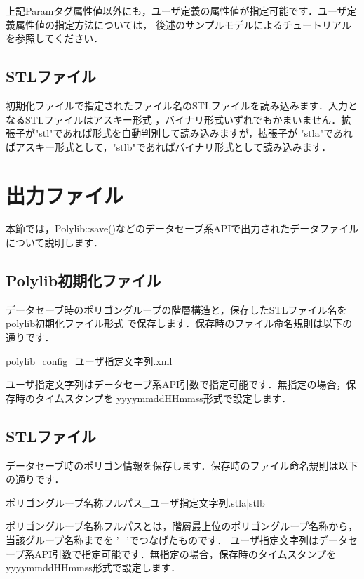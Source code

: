{上記Paramタグ属性値以外にも，ユーザ定義の属性値が指定可能です．ユーザ定義属性値の指定方法については，
後述のサンプルモデルによるチュートリアルを参照してください．

%
\subsection{STLファイル}
初期化ファイルで指定されたファイル名のSTLファイルを読み込みます．入力となるSTLファイルはアスキー形式
，バイナリ形式いずれでもかまいません．拡張子が"stl"であれば形式を自動判別して読み込みますが，拡張子が
"stla"であればアスキー形式として，"stlb"であればバイナリ形式として読み込みます．

%
\section{出力ファイル} \label{output_file}
本節では，Polylib::save()などのデータセーブ系APIで出力されたデータファイルについて説明します．

\subsection{Polylib初期化ファイル}

データセーブ時のポリゴングループの階層構造と，保存したSTLファイル名をpolylib初期化ファイル形式
で保存します．保存時のファイル命名規則は以下の通りです．

\begin{program}
	polylib_config_{ユーザ指定文字列}.xml
\end{program}

ユーザ指定文字列はデータセーブ系API引数で指定可能です．無指定の場合，保存時のタイムスタンプを
yyyymmddHHmmss形式で設定します．

%
\subsection{STLファイル}

データセーブ時のポリゴン情報を保存します．保存時のファイル命名規則は以下の通りです．

\begin{program}
	{ポリゴングループ名称フルパス}_{ユーザ指定文字列}.{stla|stlb}
\end{program}

ポリゴングループ名称フルパスとは，階層最上位のポリゴングループ名称から，当該グループ名称までを
'\_'でつなげたものです．
ユーザ指定文字列はデータセーブ系API引数で指定可能です．無指定の場合，保存時のタイムスタンプを
yyyymmddHHmmss形式で設定します．

}
